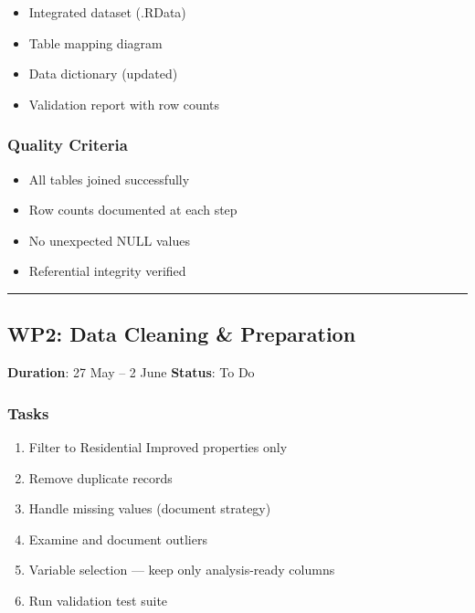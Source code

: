 \documentclass[
  english,
  letterpaper,
  DIV=11,
  numbers=noendperiod]{scrreprt}
\providecommand{\tightlist}{%
  \setlength{\itemsep}{0pt}\setlength{\parskip}{0pt}}
\begin{document}
\begin{itemize}
\tightlist
\item
  Integrated dataset (.RData)
\item
  Table mapping diagram
\item
  Data dictionary (updated)
\item
  Validation report with row counts
\end{itemize}

\subsubsection{Quality Criteria}\label{quality-criteria}

\begin{itemize}
\tightlist
\item[$\square$]
  All tables joined successfully
\item[$\square$]
  Row counts documented at each step
\item[$\square$]
  No unexpected NULL values
\item[$\square$]
  Referential integrity verified
\end{itemize}

\begin{center}\rule{0.5\linewidth}{0.5pt}\end{center}

\subsection{WP2: Data Cleaning \&
Preparation}\label{wp2-data-cleaning-preparation}

\textbf{Duration}: 27 May -- 2 June \textbar{} \textbf{Status}: To Do

\subsubsection{Tasks}\label{tasks-2}

\begin{enumerate}
\def\labelenumi{\arabic{enumi}.}
\tightlist
\item
  Filter to Residential Improved properties only
\item
  Remove duplicate records
\item
  Handle missing values (document strategy)
\item
  Examine and document outliers
\item
  Variable selection --- keep only analysis-ready columns
\item
  Run validation test suite
\end{enumerate}
\end{document}
